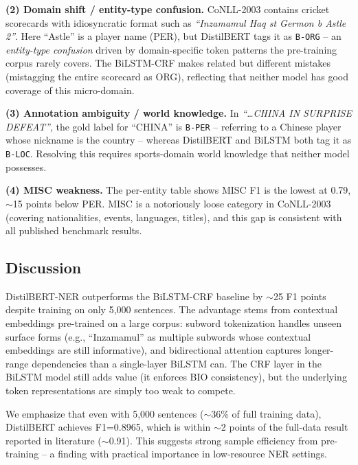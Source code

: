 \documentclass[11pt,a4paper]{article}
\begin{document}
\textbf{(2) Domain shift / entity-type confusion.} CoNLL-2003 contains cricket scorecards with idiosyncratic format such as \textit{``Inzamamul Haq st Germon b Astle 2''}. Here ``Astle'' is a player name (PER), but DistilBERT tags it as \texttt{B-ORG} -- an \emph{entity-type confusion} driven by domain-specific token patterns the pre-training corpus rarely covers. The BiLSTM-CRF makes related but different mistakes (mistagging the entire scorecard as ORG), reflecting that neither model has good coverage of this micro-domain.

\textbf{(3) Annotation ambiguity / world knowledge.} In \textit{``\dots CHINA IN SURPRISE DEFEAT''}, the gold label for ``CHINA'' is \texttt{B-PER} -- referring to a Chinese player whose nickname is the country -- whereas DistilBERT and BiLSTM both tag it as \texttt{B-LOC}. Resolving this requires sports-domain world knowledge that neither model possesses.

\textbf{(4) MISC weakness.} The per-entity table shows MISC F1 is the lowest at 0.79, $\sim$15 points below PER. MISC is a notoriously loose category in CoNLL-2003 (covering nationalities, events, languages, titles), and this gap is consistent with all published benchmark results.

\subsection{Discussion}

DistilBERT-NER outperforms the BiLSTM-CRF baseline by $\sim$25 F1 points despite training on only 5{,}000 sentences. The advantage stems from contextual embeddings pre-trained on a large corpus: subword tokenization handles unseen surface forms (e.g., ``Inzamamul'' as multiple subwords whose contextual embeddings are still informative), and bidirectional attention captures longer-range dependencies than a single-layer BiLSTM can. The CRF layer in the BiLSTM model still adds value (it enforces BIO consistency), but the underlying token representations are simply too weak to compete.

We emphasize that even with 5{,}000 sentences ($\sim$36\% of full training data), DistilBERT achieves F1=0.8965, which is within $\sim$2 points of the full-data result reported in literature ($\sim$0.91). This suggests strong sample efficiency from pre-training -- a finding with practical importance in low-resource NER settings.

\end{document}
